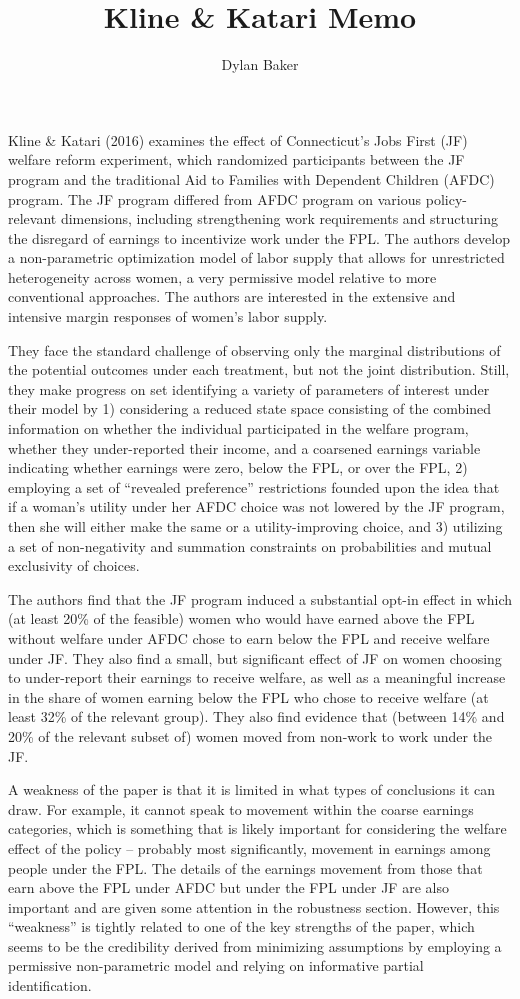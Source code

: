 \documentclass[11pt]{article}
\title{Kline \& Katari Memo}
\author{Dylan Baker}
\begin{document}
Kline \& Katari (2016)
examines the effect of 
Connecticut's Jobs First (JF)
welfare reform experiment,
which randomized participants between
the JF program and the traditional
Aid to Families with Dependent Children (AFDC)
program. The JF program differed from 
AFDC program on various policy-relevant dimensions,
including strengthening work requirements
and structuring the disregard of earnings 
to incentivize work under the FPL.
The authors develop a non-parametric 
optimization model of labor supply
that allows for unrestricted heterogeneity
across women, a very permissive 
model relative to more conventional approaches.
The authors are interested in the 
extensive and intensive margin responses 
of women's labor supply. 

They face the 
standard challenge of observing 
only the marginal distributions of the potential outcomes
under each treatment, but not the joint distribution.
Still, they make progress on set identifying
a variety of parameters of interest under their model 
by 1) considering a 
reduced state space consisting of the combined information on 
whether the 
individual participated in the welfare program,
whether they under-reported their income, and 
a coarsened earnings variable indicating whether 
earnings were zero, below the FPL, or over the FPL,
2) employing a set of 
``revealed preference'' restrictions
founded upon the idea that if a woman's utility 
under her AFDC choice was not lowered by the JF program,
then she will either make the same or a utility-improving 
choice, and 3) utilizing a set of non-negativity and summation
constraints on probabilities and mutual exclusivity of 
choices.

The authors find that the JF program
induced a substantial opt-in effect 
in which (at least 20\% of the feasible) 
women who would have earned 
above the FPL without welfare under AFDC chose to
earn below the FPL and receive 
welfare under JF. They also find a small, but significant
effect of JF on women choosing to under-report their earnings 
to receive welfare, as well as a meaningful increase 
in the share of women earning below the FPL 
who chose to receive welfare (at least 32\% of the 
relevant group). They also find evidence that (between 14\% and 
20\% of the relevant subset of) women 
moved from non-work to work under the JF. 

A weakness of the paper is that it
is limited in what types of conclusions 
it can draw. For example, it cannot speak to 
movement within the coarse earnings categories, which is 
something that is likely important for considering the
welfare
effect of the policy -- probably most significantly, movement in 
earnings among people under the FPL. The details of the 
earnings movement from those that earn above the FPL 
under AFDC but under the FPL under JF are also important 
and are given some attention in the robustness section.
However, this ``weakness'' is 
tightly related to one of the key strengths of the paper,
which seems to be the credibility derived 
from minimizing assumptions by employing a permissive
non-parametric model and relying on informative 
partial identification. 
\end{document}
